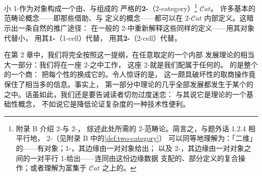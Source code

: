 \providecommand{\Fun}{\operatorname{Fun}}
\providecommand{\Cat}{\mathcal{C}at}
\providecommand{\sSet}{s\mathcal{S}et}
\providecommand{\QCat}{\mathcal{Q}\mathcal{C}at}
\providecommand{\qcOne}{\mathbf{1}}  %
\providecommand{\qcTwo}{\mathbf{2}}  %
\providecommand{\qcInt}{\mathbb{I}}  %
\providecommand{\rvEqArrow}{\mathrel{\stackrel{\sim}{\Rightarrow}}} %
\providecommand{\rvTfibArrow}{\mathrel{\stackrel{\sim}{\twoheadrightarrow}}} %
\providecommand{\hcat}[1]{\hbar #1}  %
\providecommand{\rvCorner}[1]{\ulcorner #1\urcorner} %
\providecommand{\hTwoCell}[5]{\tikz[baseline=-0.8ex]{%
  \node (rvl) at (0,0) {$#1$};
  \node (rvr) at (2.9,0) {$#2$};
  \draw[->] (rvl) to[bend left=28] node[above]{$\scriptstyle #3$} (rvr);
  \draw[->] (rvl) to[bend right=28] node[below]{$\scriptstyle #5$} (rvr);
  \node at (1.45,0) {$\scriptstyle #4$};}}

\section{\trHomotopyTwoCategory}\label{sec:homotopy-2-category}

小 1-\trCategory{}作为对象构成一个由\trCategory{}、\trFunctor{}与\trNaturalTransformation{}组成的%
严格的\textbf{2-\trCategory}（2-category）\footnote{附录 B 介绍 2-\trCategory{}与 2-\trFunctor{}，
综述此处所需的 2-范畴论。简言之，与题外话 1.2.4 相平行地，%
2-\trCategory{}（见附录 B 中的\cref{def:two-category}）
可以同等地理解为：「二维」的\trCategory——有对象；1-\trCell{}，其边缘由一对对象给出；
以及 2-\trCell{}，其边缘由一对对象之间的一对平行 1-\trCell{}给出——连同由这份边缘数据
支配的、部分定义的复合操作；或者理解为富集于 $\Cat$ 之上的\trCategory{}。} $\Cat$。
许多基本的范畴论概念——即那些借助\trCategory{}、\trFunctor{}与\trNaturalTransformation{}%
定义的概念——都可以在 2-\trCategory $\Cat$ 内部定义。这暗示出一条自然的推广途径：
在一般的 2-\trCategory{}中重新解释这些同样的定义——用其对象代替小\trCategory{}，
用其\textbf{1-\trCell}（1-cell）代替\trFunctor{}，
用其\textbf{2-\trCell}（2-cell）代替\trNaturalTransformation{}。

在第 2 章中，我们将完全按照这一提纲，在任意取定的一个\trInfinityCosmos{}内部
发展\trInfinityCategory{}理论的相当大一部分：我们将在一座 2-\trCategory{}之中工作，
这座 2-\trCategory{}就是我们配属于任何\trInfinityCosmos{}的\emph{\trHomotopyTwoCategory}。
\trInfinityCosmos{}的\trHomotopyTwoCategory{}是整个\trInfinityCosmos{}的一个商：
把每个\trQuasiCategory{}性的\trFunctorSpace{}换成它的\trHomotopyCategory{}。令人惊讶的是，
这一颇具破坏性的取商操作竟保住了相当多的信息。事实上，
第一部分中\trInfinityCategory{}理论的几乎全部发展都发生于某个\trInfinityCosmos{}的%
\trHomotopyTwoCategory{}之中。话虽如此，我们还是要告诫读者切勿过度迷恋\trHomotopyTwoCategory{}：
与其说它是\trInfinityCategory{}理论的一个基础性概念，
不如说它是降低论证复杂度的一种技术性便利。

